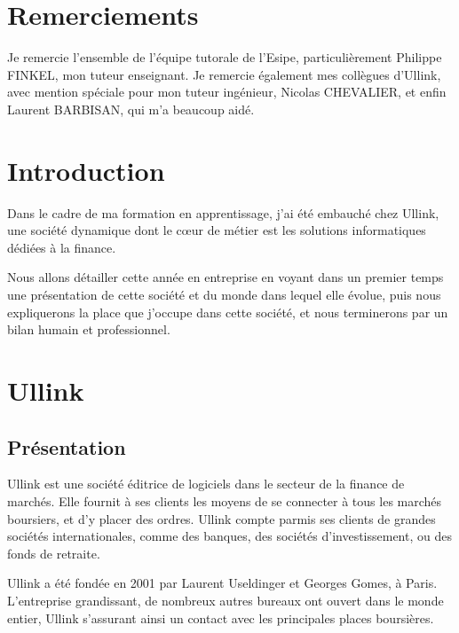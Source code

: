 \documentclass[a4paper, 12pt]{article}
\begin{document}

\pagebreak

\section*{Remerciements}
Je remercie l'ensemble de l'équipe tutorale de l'Esipe, particulièrement Philippe FINKEL, mon tuteur enseignant. Je remercie également mes collègues d'Ullink, avec mention spéciale pour mon tuteur ingénieur, Nicolas CHEVALIER, et enfin Laurent BARBISAN, qui m'a beaucoup aidé.

\pagebreak

\section*{Introduction}

Dans le cadre de ma formation en apprentissage, j'ai été embauché chez Ullink, une société dynamique dont le c\oe{}ur de métier est les solutions informatiques dédiées à la finance.

Nous allons détailler cette année en entreprise en voyant dans un premier temps une présentation de cette société et du monde dans lequel elle évolue, puis nous expliquerons la place que j'occupe dans cette société, et nous terminerons par un bilan humain et professionnel.
\pagebreak
\tableofcontents
\pagebreak

\section{Ullink}
\subsection{Présentation}
Ullink est une société éditrice de logiciels dans le secteur de la finance de marchés. Elle fournit à ses clients les moyens de se connecter à tous les marchés boursiers, et d'y placer des ordres. Ullink compte parmis ses clients de grandes sociétés internationales, comme des banques, des sociétés d'investissement, ou des fonds de retraite.

Ullink a été fondée en 2001 par Laurent Useldinger et Georges Gomes, à Paris. L'entreprise grandissant, de nombreux autres bureaux ont ouvert dans le monde entier, Ullink s'assurant ainsi un contact avec les principales places boursières.
\end{document}
